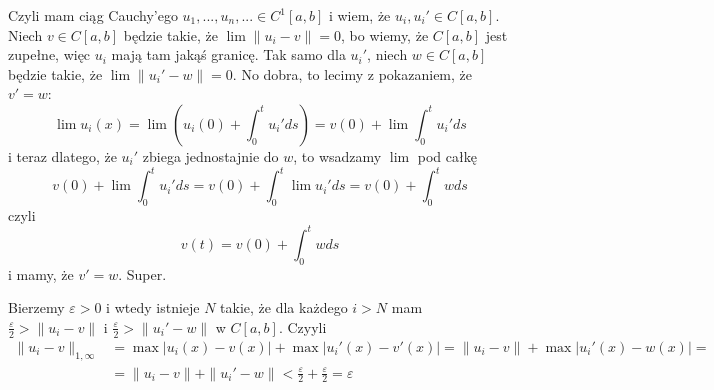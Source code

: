 \documentclass{article}
\begin{document}

Czyli mam ciąg Cauchy'ego $u_1,...,u_n,...\in C^1[a, b]$ i wiem, że $u_i,u_i'\in C[a, b]$. Niech $v\in C[a,b]$ będzie takie, że $\lim\|u_i-v\|=0$, bo wiemy, że $C[a,b]$ jest zupełne, więc $u_i$ mają tam jakąś granicę. Tak samo dla $u_i'$, niech $w\in C[a, b]$ będzie takie, że $\lim\|u_i'-w\|=0$. No dobra, to lecimy z pokazaniem, że $v'=w$:
$$\lim u_i(x)=\lim \left(u_i(0)+\int_0^tu_i'ds\right)=v(0)+\lim\int_0^tu_i'ds$$
i teraz dlatego, że $u_i'$ zbiega jednostajnie do $w$, to wsadzamy $\lim$ pod całkę
$$v(0)+\lim\int_0^tu_i'ds=v(0)+\int_0^t\lim u_i'ds=v(0)+\int_0^twds$$
czyli
$$v(t)=v(0)+\int_0^twds$$
i mamy, że $v'=w$. Super.

Bierzemy $\varepsilon>0$ i wtedy istnieje $N$ takie, że dla każdego $i>N$ mam $\frac\varepsilon2>\|u_i-v\|$ i $\frac\varepsilon2>\|u_i'-w\|$ w $C[a,b]$. Czyyli
\begin{align*}
    \|u_i-v\|_{1,\infty}&=\max|u_i(x)-v(x)|+\max|u_i'(x)-v'(x)|=\|u_i-v\|+\max|u_i'(x)-w(x)|=\\
    &=\|u_i-v\|+\|u_i'-w\|<\frac\varepsilon2+\frac\varepsilon2=\varepsilon
\end{align*}
\end{document}
